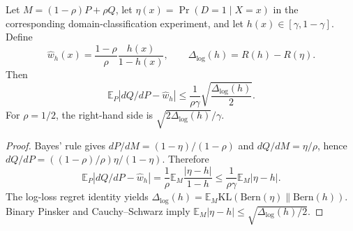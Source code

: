 \begin{theorem}
Let $M=(1-\rho)P+\rho Q$, let $\eta(x)=\Pr(D=1\mid X=x)$ in the corresponding
domain-classification experiment, and let $h(x)\in[\gamma,1-\gamma]$. Define
\[
\widehat w_h(x)=\frac{1-\rho}{\rho}\frac{h(x)}{1-h(x)},
\qquad
\Delta_{\log}(h)=R(h)-R(\eta).
\]
Then
\[
\mathbb E_P|dQ/dP-\widehat w_h|
\le \frac{1}{\rho\gamma}\sqrt{\frac{\Delta_{\log}(h)}{2}}.
\]
For $\rho=1/2$, the right-hand side is $\sqrt{2\Delta_{\log}(h)}/\gamma$.
\end{theorem}

\begin{proof}
Bayes' rule gives $dP/dM=(1-\eta)/(1-\rho)$ and
$dQ/dM=\eta/\rho$, hence $dQ/dP=((1-\rho)/\rho)\eta/(1-\eta)$. Therefore
\[
\mathbb E_P|dQ/dP-\widehat w_h|
=\frac1\rho\mathbb E_M\frac{|\eta-h|}{1-h}
\le\frac1{\rho\gamma}\mathbb E_M|\eta-h|.
\]
The log-loss regret identity yields
$\Delta_{\log}(h)=\mathbb E_M\mathrm{KL}(\mathrm{Bern}(\eta)\|\mathrm{Bern}(h))$.
Binary Pinsker and Cauchy--Schwarz imply
$\mathbb E_M|\eta-h|\le\sqrt{\Delta_{\log}(h)/2}$.
\end{proof}
